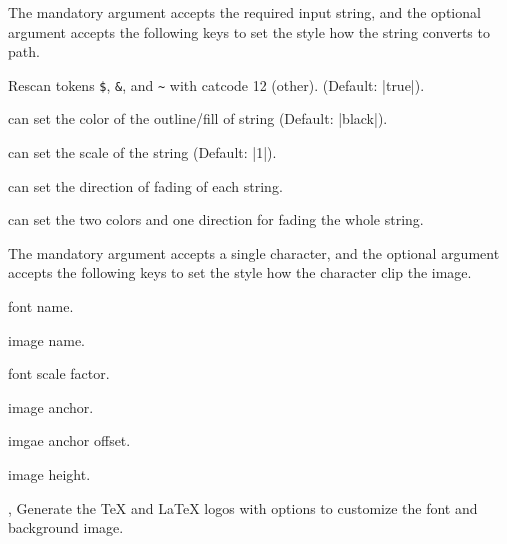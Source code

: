 \documentclass[lm-default]{l3doc}
\begin{document}
\begin{documentation}
\begin{function}[updated=2025-07-26]{\chartopath}
  \begin{syntax}
      
  \end{syntax}
  The mandatory argument accepts the required input string, and the optional
  argument accepts the following keys to set the style how the string converts
  to path.
  \begin{keyval}
    \item [\key{rescan}]  Rescan tokens \verb|$|, \verb|&|, and \verb|~| with catcode 12 (other). 
    (Default: |true|).
    \item [\key{draw,fill}]  can set the color of the outline/fill of string
    (Default: |black|).
    \item [\key{scale}]  can set the scale of the string
    (Default: |1|).
    \item [\key{path fading}]  can set the direction of
    fading of each string.
    \item [\key{fading}]  can set the two colors and one direction for fading the whole string.
  \end{keyval}
\end{function}


\begin{function}[added=2025-07-26]{\charpathclip}
  \begin{syntax}
      
  \end{syntax}
  The mandatory argument accepts a single character, and the optional
  argument accepts the following keys to set the style how the character clip
  the image.
  \begin{keyval}
    \item [\key{font}]  font name.
    \item [\key{image}]  image name.
    \item [\key{scale}]  font scale factor.
    \item [\key{anchor}]  image anchor.
    \item [\key{offset}]  imgae anchor offset.
    \item [\key{height}]  image height.
  \end{keyval}
\end{function}


\begin{function}[added=2025-07-26]{\ctpTeX, \ctpLaTeX}
  Generate the \TeX{} and \LaTeX{} logos with options to customize the font and background image.
\end{function}



\end{documentation}
\end{document}

